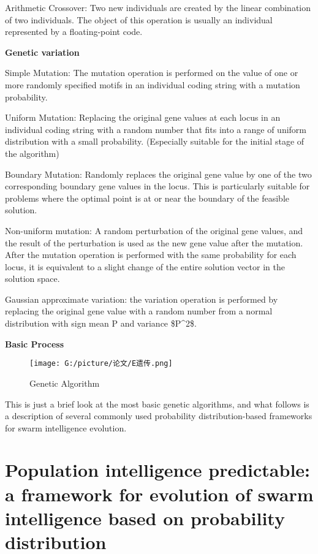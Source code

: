 \documentclass[twocolumn]{article}
\begin{document}
\begin{enumerate}
		Arithmetic Crossover: Two new individuals are created by the linear
		combination of two individuals. The object of this operation is
		usually an individual represented by a floating-point code.

	
	\textbf{Genetic variation}
	

		Simple Mutation: The mutation operation is performed on the value of
		one or more randomly specified motifs in an individual coding string
		with a mutation probability.

		Uniform Mutation: Replacing the original gene values at each locus
		in an individual coding string with a random number that fits into a
		range of uniform distribution with a small probability. (Especially
		suitable for the initial stage of the algorithm)

		Boundary Mutation: Randomly replaces the original gene value by one
		of the two corresponding boundary gene values in the locus. This is
		particularly suitable for problems where the optimal point is at or
		near the boundary of the feasible solution.

		Non-uniform mutation: A random perturbation of the original gene
		values, and the result of the perturbation is used as the new gene
		value after the mutation. After the mutation operation is performed
		with the same probability for each locus, it is equivalent to a
		slight change of the entire solution vector in the solution space.

		Gaussian approximate variation: the variation operation is performed
		by replacing the original gene value with a random number from a
		normal distribution with sign mean P and variance \$P\^{}2\$.
\end{enumerate}

\textbf{Basic Process}


\begin{figure}
	\centering
	\texttt{[image: G:/picture/论文/E遗传.png]}
	\caption{Genetic Algorithm}
\end{figure}
This is just a brief look at the most basic genetic algorithms, and what
follows is a description of several commonly used probability
distribution-based frameworks for swarm intelligence evolution.


\section{Population intelligence predictable: a framework for evolution of swarm intelligence based on probability distribution}
\end{document}
